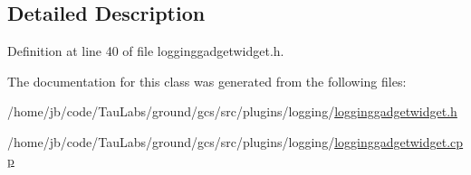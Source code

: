 \subsection{\-Detailed \-Description}


\-Definition at line 40 of file logginggadgetwidget.\-h.



\-The documentation for this class was generated from the following files\-:\begin{DoxyCompactItemize}
\item 
/home/jb/code/\-Tau\-Labs/ground/gcs/src/plugins/logging/\hyperlink{logginggadgetwidget_8h}{logginggadgetwidget.\-h}\item 
/home/jb/code/\-Tau\-Labs/ground/gcs/src/plugins/logging/\hyperlink{logginggadgetwidget_8cpp}{logginggadgetwidget.\-cpp}\end{DoxyCompactItemize}
